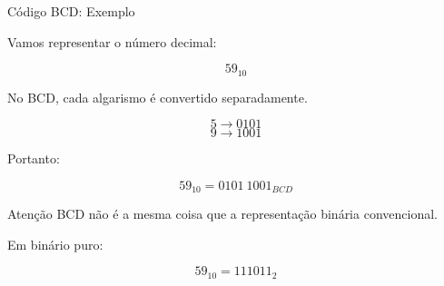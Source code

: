 
\begin{frame}{Código BCD: Exemplo}
    \small

    Vamos representar o número decimal:

    \[
        59_{10}
    \]

    No BCD, cada algarismo é convertido separadamente.

    \[
        5 \rightarrow 0101
    \]
    \[
        9 \rightarrow 1001
    \]

    Portanto:

    \[
        \boxed{59_{10} = 0101\ 1001_{BCD}}
    \]

    \begin{alertblock}{Atenção}
        BCD não é a mesma coisa que a representação binária convencional.
    \end{alertblock}

    Em binário puro:

    \[
        59_{10}=111011_2
    \]

\end{frame}
